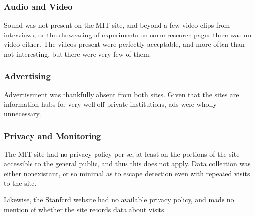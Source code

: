 
\subsubsection*{Audio and Video}

Sound was not present on the MIT site, and beyond a few video clips from interviews, or the
showcasing of experiments on some research pages there was no video either. The videos
present were perfectly acceptable, and more often than not interesting, but there were very
few of them.


\subsubsection*{Advertising}

Advertisement was thankfully absent from both sites. Given that the sites are information hubs
for very well-off private institutions, ads were wholly unnecessary.

\subsubsection*{Privacy and Monitoring}

The MIT site had no privacy policy per se, at least on the portions of the site accessible to the
general public, and thus this does not apply. Data collection was either nonexistant, or so
minimal as to escape detection even with repeated visits to the site.

Likewise, the Stanford website had no available privacy policy, and made no mention
of whether the site records data about visits.
